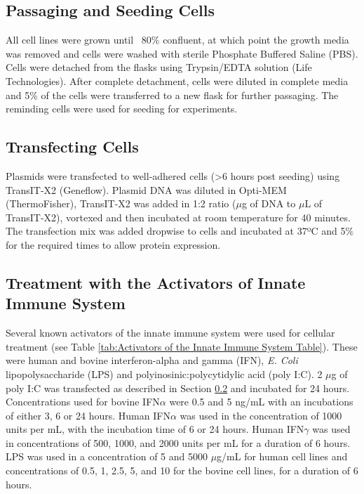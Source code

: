 \subsection{Passaging and Seeding Cells} \label{subsec:Passaging and Seeding Cells}
All cell lines were grown until ~80\% confluent, at which point the growth media was removed and cells were washed with sterile Phosphate Buffered Saline (PBS). Cells were detached from the flasks using Trypsin/EDTA solution (Life Technologies). After complete detachment, cells were diluted in complete media and 5\% of the cells were transferred to a new flask for further passaging. The reminding cells were used for seeding for experiments.




\subsection{Transfecting Cells} \label{subsec:Transfecting Cells}
Plasmids were transfected to well-adhered cells (>6 hours post seeding) using TransIT-X2 (Geneflow). Plasmid DNA was diluted in Opti-MEM (ThermoFisher), TransIT-X2 was added in 1:2 ratio (\(\mu\)g of DNA to \(\mu\)L of TransIT-X2), vortexed and then incubated at room temperature for 40 minutes. The transfection mix was added dropwise to cells and incubated at 37ºC and 5\%  for the required times to allow protein expression.




\subsection{Treatment with the Activators of Innate Immune System} \label{subsec:Treatment with the Activators of Innate Immune System}
Several known activators of the innate immune system were used for cellular treatment (see Table \ref{tab:Activators of the Innate Immune System Table}). These were human and bovine interferon-alpha and gamma (IFN), \textit{E. Coli} lipopolysaccharide (LPS) and polyinosinic:polycytidylic acid (poly I:C). 2 \(\mu\)g of poly I:C was transfected as described in Section \ref{subsec:Transfecting Cells} and incubated for 24 hours. Concentrations used for bovine IFN\(\alpha\) were 0.5 and 5 ng/mL with an incubations of either 3, 6 or 24 hours. Human IFN\(\alpha\) was used in the concentration of 1000 units per mL, with the incubation time of 6 or 24 hours. Human IFN\(\gamma\) was used in concentrations of 500, 1000, and 2000 units per mL for a duration of 6 hours. LPS was used in a concentration of 5 and 5000 \(\mu\)g/mL for human cell lines and concentrations of 0.5, 1, 2.5, 5, and 10 for the bovine cell lines, for a duration of 6 hours.
 
